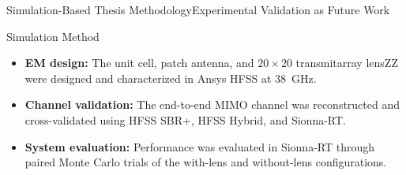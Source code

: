\begin{frame}{Simulation-Based Thesis Methodology}{Experimental Validation as Future Work}
  \begin{block}{Simulation Method}
    \begin{itemize}
      \item \textbf{EM design:} The unit cell, patch antenna, and
            $20\!\times\!20$ transmitarray lensZZ
            were designed and characterized in Ansys HFSS at 38~GHz.
      \item \textbf{Channel validation:} The end-to-end MIMO channel was
            reconstructed and cross-validated
            using HFSS SBR+, HFSS Hybrid, and Sionna-RT.
      \item \textbf{System evaluation:} Performance was evaluated in Sionna-RT
            through paired
            Monte Carlo trials of the with-lens and without-lens configurations.
    \end{itemize}
  \end{block}

\end{frame}

